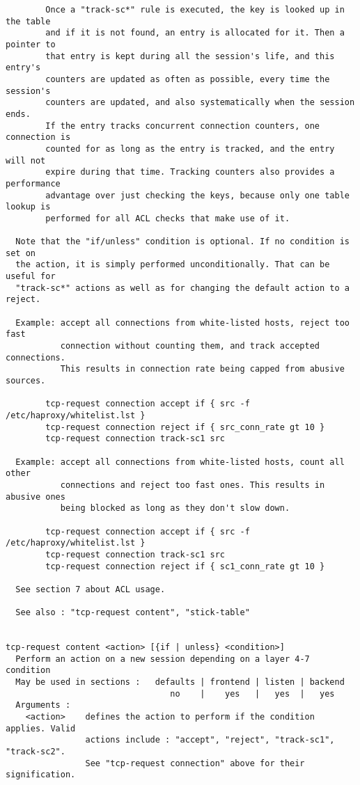\begin{verbatim}
        Once a "track-sc*" rule is executed, the key is looked up in the table
        and if it is not found, an entry is allocated for it. Then a pointer to
        that entry is kept during all the session's life, and this entry's
        counters are updated as often as possible, every time the session's
        counters are updated, and also systematically when the session ends.
        If the entry tracks concurrent connection counters, one connection is
        counted for as long as the entry is tracked, and the entry will not
        expire during that time. Tracking counters also provides a performance
        advantage over just checking the keys, because only one table lookup is
        performed for all ACL checks that make use of it.

  Note that the "if/unless" condition is optional. If no condition is set on
  the action, it is simply performed unconditionally. That can be useful for
  "track-sc*" actions as well as for changing the default action to a reject.

  Example: accept all connections from white-listed hosts, reject too fast
           connection without counting them, and track accepted connections.
           This results in connection rate being capped from abusive sources.

        tcp-request connection accept if { src -f /etc/haproxy/whitelist.lst }
        tcp-request connection reject if { src_conn_rate gt 10 }
        tcp-request connection track-sc1 src

  Example: accept all connections from white-listed hosts, count all other
           connections and reject too fast ones. This results in abusive ones
           being blocked as long as they don't slow down.

        tcp-request connection accept if { src -f /etc/haproxy/whitelist.lst }
        tcp-request connection track-sc1 src
        tcp-request connection reject if { sc1_conn_rate gt 10 }

  See section 7 about ACL usage.

  See also : "tcp-request content", "stick-table"


tcp-request content <action> [{if | unless} <condition>]
  Perform an action on a new session depending on a layer 4-7 condition
  May be used in sections :   defaults | frontend | listen | backend
                                 no    |    yes   |   yes  |   yes
  Arguments :
    <action>    defines the action to perform if the condition applies. Valid
                actions include : "accept", "reject", "track-sc1", "track-sc2".
                See "tcp-request connection" above for their signification.


\end{verbatim}
